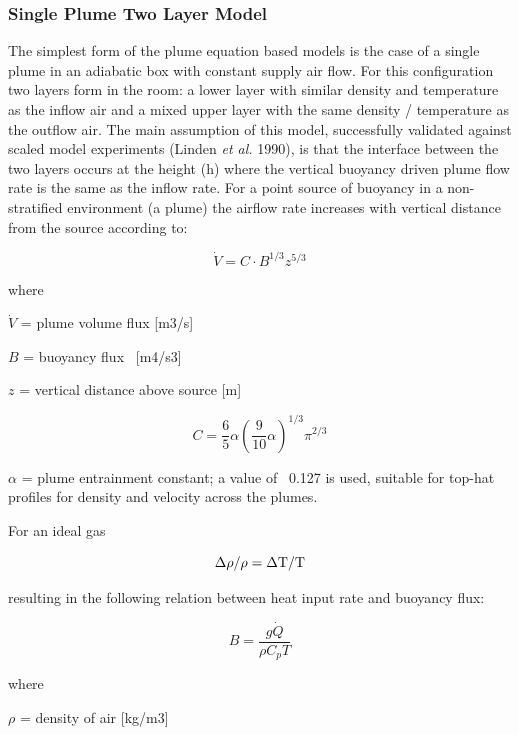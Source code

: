 \subsubsection{Single Plume Two Layer Model}\label{single-plume-two-layer-model}

The simplest form of the plume equation based models is the case of a single plume in an adiabatic box with constant supply air flow. For this configuration two layers form in the room: a lower layer with similar density and temperature as the inflow air and a mixed upper layer with the same density / temperature as the outflow air. The main assumption of this model, successfully validated against scaled model experiments (Linden \emph{et al.} 1990), is that the interface between the two layers occurs at the height (h) where the vertical buoyancy driven plume flow rate is the same as the inflow rate. For a point source of buoyancy in a non-stratified environment (a plume) the airflow rate increases with vertical distance from the source according to:

\begin{equation}
\dot V = C\cdot {B^{1/3}}{z^{5/3}}
\end{equation}

where

\(\dot V\) = plume volume flux {[}m3/s{]}

\(B\) = buoyancy flux~ {[}m4/s3{]}

\(z\) = vertical distance above source {[}m{]}

\begin{equation}
C = \frac{6}{5}\alpha {(\frac{9}{{10}}\alpha )^{1/3}}{\pi ^{2/3}}
\end{equation}

\(\alpha\) = plume entrainment constant; a value of~ 0.127 is used, suitable for top-hat profiles for density and velocity across the plumes.

For an ideal gas

\begin{equation}
\Delta \rho /\rho  = \Delta {\rm T}/{\rm T}
\end{equation}

resulting in the following relation between heat input rate and buoyancy flux:

\begin{equation}
B = \frac{{g\dot Q}}{{\rho {C_p}T}}
\end{equation}

where

\(\rho\) = density of air {[}kg/m3{]}

